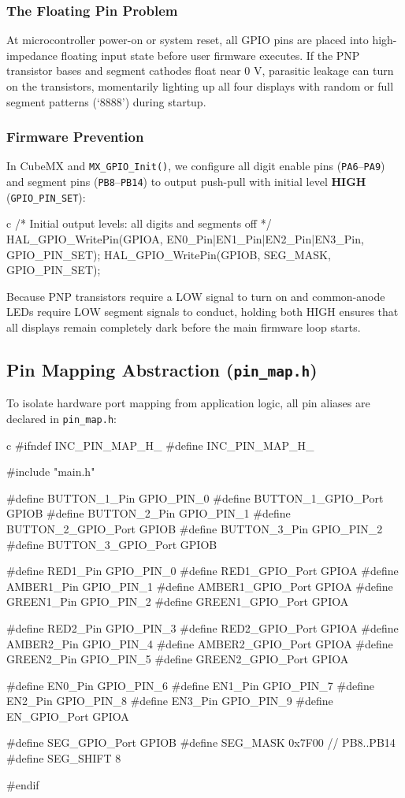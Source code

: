 \documentclass{hcmut-report}
\begin{document}
\subsubsection{The Floating Pin Problem}
At microcontroller power-on or system reset, all GPIO pins are placed into high-impedance floating input state before user firmware executes. If the PNP transistor bases and segment cathodes float near 0 V, parasitic leakage can turn on the transistors, momentarily lighting up all four displays with random or full segment patterns (`8888') during startup.

\subsubsection{Firmware Prevention}
In CubeMX and \texttt{MX\_GPIO\_Init()}, we configure all digit enable pins (\texttt{PA6}--\texttt{PA9}) and segment pins (\texttt{PB8}--\texttt{PB14}) to output push-pull with initial level \textbf{HIGH} (\texttt{GPIO\_PIN\_SET}):
\begin{code}{c}
/* Initial output levels: all digits and segments off */
HAL_GPIO_WritePin(GPIOA, EN0_Pin|EN1_Pin|EN2_Pin|EN3_Pin, GPIO_PIN_SET);
HAL_GPIO_WritePin(GPIOB, SEG_MASK, GPIO_PIN_SET);
\end{code}
Because PNP transistors require a LOW signal to turn on and common-anode LEDs require LOW segment signals to conduct, holding both HIGH ensures that all displays remain completely dark before the main firmware loop starts.

\subsection{Pin Mapping Abstraction (\texttt{pin\_map.h})}
To isolate hardware port mapping from application logic, all pin aliases are declared in \texttt{pin\_map.h}:
\begin{code}{c}
#ifndef INC_PIN_MAP_H_
#define INC_PIN_MAP_H_

#include "main.h"

#define BUTTON_1_Pin        GPIO_PIN_0
#define BUTTON_1_GPIO_Port  GPIOB
#define BUTTON_2_Pin        GPIO_PIN_1
#define BUTTON_2_GPIO_Port  GPIOB
#define BUTTON_3_Pin        GPIO_PIN_2
#define BUTTON_3_GPIO_Port  GPIOB

#define RED1_Pin            GPIO_PIN_0
#define RED1_GPIO_Port      GPIOA
#define AMBER1_Pin          GPIO_PIN_1
#define AMBER1_GPIO_Port    GPIOA
#define GREEN1_Pin          GPIO_PIN_2
#define GREEN1_GPIO_Port    GPIOA

#define RED2_Pin            GPIO_PIN_3
#define RED2_GPIO_Port      GPIOA
#define AMBER2_Pin          GPIO_PIN_4
#define AMBER2_GPIO_Port    GPIOA
#define GREEN2_Pin          GPIO_PIN_5
#define GREEN2_GPIO_Port    GPIOA

#define EN0_Pin             GPIO_PIN_6
#define EN1_Pin             GPIO_PIN_7
#define EN2_Pin             GPIO_PIN_8
#define EN3_Pin             GPIO_PIN_9
#define EN_GPIO_Port        GPIOA

#define SEG_GPIO_Port       GPIOB
#define SEG_MASK            0x7F00      // PB8..PB14
#define SEG_SHIFT           8

#endif
\end{code}
\end{document}
